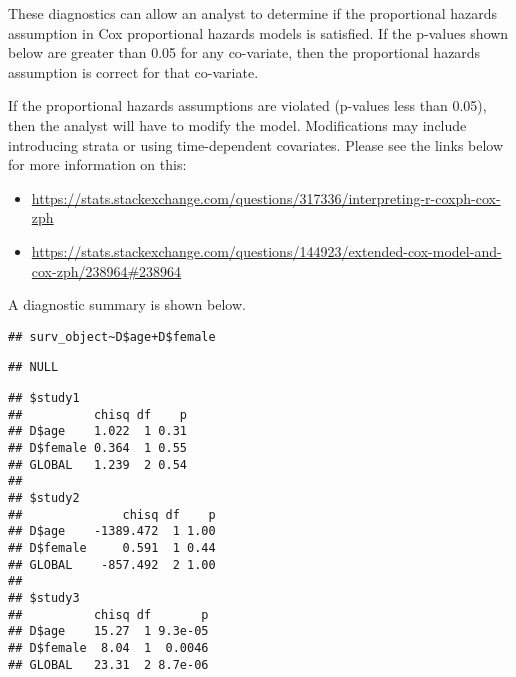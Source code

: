 \documentclass[
]{article}
\begin{document}
These diagnostics can allow an analyst to determine if the proportional
hazards assumption in Cox proportional hazards models is satisfied. If
the p-values shown below are greater than 0.05 for any co-variate, then
the proportional hazards assumption is correct for that co-variate.

If the proportional hazards assumptions are violated (p-values less than
0.05), then the analyst will have to modify the model. Modifications may
include introducing strata or using time-dependent covariates. Please
see the links below for more information on this:

\begin{itemize}
\item
  \url{https://stats.stackexchange.com/questions/317336/interpreting-r-coxph-cox-zph}
\item
  \url{https://stats.stackexchange.com/questions/144923/extended-cox-model-and-cox-zph/238964\#238964}
\end{itemize}

A diagnostic summary is shown below.

\begin{verbatim}
## surv_object~D$age+D$female
\end{verbatim}

\begin{verbatim}
## NULL
\end{verbatim}

\begin{verbatim}
## $study1
##          chisq df    p
## D$age    1.022  1 0.31
## D$female 0.364  1 0.55
## GLOBAL   1.239  2 0.54
## 
## $study2
##              chisq df    p
## D$age    -1389.472  1 1.00
## D$female     0.591  1 0.44
## GLOBAL    -857.492  2 1.00
## 
## $study3
##          chisq df       p
## D$age    15.27  1 9.3e-05
## D$female  8.04  1  0.0046
## GLOBAL   23.31  2 8.7e-06
\end{verbatim}
\end{document}
